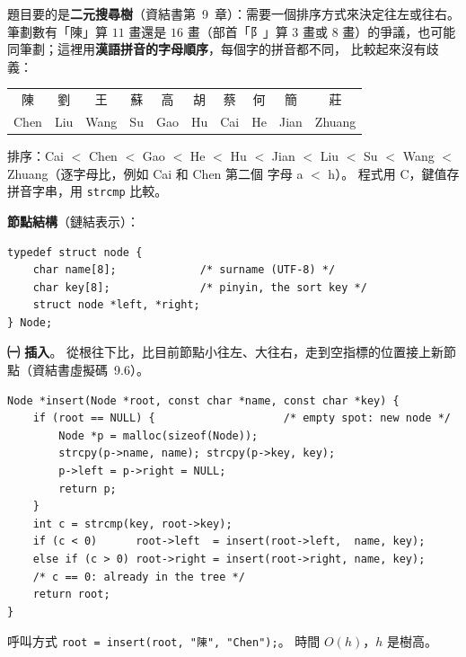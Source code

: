 \begin{pastsoln}
題目要的是\textbf{二元搜尋樹}（資結書第~9~章）：需要一個排序方式來決定往左或往右。 筆劃數有「陳」算 $11$ 畫還是
$16$ 畫（部首「阝」算 $3$ 畫或 $8$ 畫）的爭議，也可能同筆劃；這裡用\textbf{漢語拼音的字母順序}，每個字的拼音都不同，
比較起來沒有歧義：
\begin{center}
\begin{tabular}{*{10}{c}}
\toprule
陳 & 劉 & 王 & 蘇 & 高 & 胡 & 蔡 & 何 & 簡 & 莊 \\
Chen & Liu & Wang & Su & Gao & Hu & Cai & He & Jian & Zhuang \\
\bottomrule
\end{tabular}
\end{center}
排序：Cai $<$ Chen $<$ Gao $<$ He $<$ Hu $<$ Jian $<$ Liu $<$ Su $<$ Wang $<$ Zhuang（逐字母比，例如 Cai 和 Chen 第二個
字母 a $<$ h）。 程式用 C，鍵值存拼音字串，用 \texttt{strcmp} 比較。

\textbf{節點結構}（鏈結表示）：
\begin{verbatim}
typedef struct node {
    char name[8];             /* surname (UTF-8) */
    char key[8];              /* pinyin, the sort key */
    struct node *left, *right;
} Node;
\end{verbatim}

\textbf{㈠ 插入}。 從根往下比，比目前節點小往左、大往右，走到空指標的位置接上新節點（資結書虛擬碼~9.6）。
\begin{verbatim}
Node *insert(Node *root, const char *name, const char *key) {
    if (root == NULL) {                    /* empty spot: new node */
        Node *p = malloc(sizeof(Node));
        strcpy(p->name, name); strcpy(p->key, key);
        p->left = p->right = NULL;
        return p;
    }
    int c = strcmp(key, root->key);
    if (c < 0)      root->left  = insert(root->left,  name, key);
    else if (c > 0) root->right = insert(root->right, name, key);
    /* c == 0: already in the tree */
    return root;
}
\end{verbatim}
呼叫方式 \texttt{root = insert(root, "陳", "Chen");}。 時間 $O(h)$，$h$ 是樹高。


\end{pastsoln}
